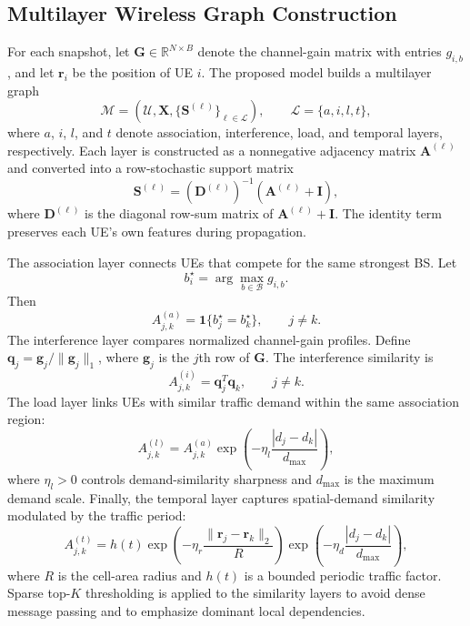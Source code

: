 \documentclass[journal]{IEEEtran}
\begin{document}
\subsection{Multilayer Wireless Graph Construction}
For each snapshot, let $\mathbf{G}\in\mathbb{R}^{N\times B}$ denote the
channel-gain matrix with entries $g_{i,b}$, and let $\mathbf{r}_i$ be the
position of UE $i$. The proposed model builds a multilayer graph
\begin{equation}
    \mathcal{M} = \left(\mathcal{U},\mathbf{X},
    \{\mathbf{S}^{(\ell)}\}_{\ell\in\mathcal{L}}\right),
    \qquad
    \mathcal{L}=\{a,i,l,t\},
\end{equation}
where $a$, $i$, $l$, and $t$ denote association, interference, load, and
temporal layers, respectively. Each layer is constructed as a nonnegative
adjacency matrix $\mathbf{A}^{(\ell)}$ and converted into a row-stochastic
support matrix
\begin{equation}
    \mathbf{S}^{(\ell)}
    =\left(\mathbf{D}^{(\ell)}\right)^{-1}
    \left(\mathbf{A}^{(\ell)}+\mathbf{I}\right),
    \label{eq:support}
\end{equation}
where $\mathbf{D}^{(\ell)}$ is the diagonal row-sum matrix of
$\mathbf{A}^{(\ell)}+\mathbf{I}$. The identity term preserves each UE's own
features during propagation.

The association layer connects UEs that compete for the same strongest BS. Let
\begin{equation}
    b_i^{\star}=\arg\max_{b\in\mathcal{B}} g_{i,b}.
\end{equation}
Then
\begin{equation}
    A_{j,k}^{(a)} =
    \mathbf{1}\{b_j^{\star}=b_k^{\star}\},
    \qquad j\neq k.
\end{equation}
The interference layer compares normalized channel-gain profiles. Define
$\mathbf{q}_j=\mathbf{g}_j/\|\mathbf{g}_j\|_1$, where $\mathbf{g}_j$ is the
$j$th row of $\mathbf{G}$. The interference similarity is
\begin{equation}
    A_{j,k}^{(i)} = \mathbf{q}_j^T\mathbf{q}_k,\qquad j\neq k.
\end{equation}
The load layer links UEs with similar traffic demand within the same
association region:
\begin{equation}
    A_{j,k}^{(l)} =
    A_{j,k}^{(a)}
    \exp\left(-\eta_l\frac{|d_j-d_k|}{d_{\max}}\right),
\end{equation}
where $\eta_l>0$ controls demand-similarity sharpness and $d_{\max}$ is the
maximum demand scale. Finally, the temporal layer captures spatial-demand
similarity modulated by the traffic period:
\begin{equation}
    A_{j,k}^{(t)} =
    h(t)\exp\left(-\eta_r\frac{\|\mathbf{r}_j-\mathbf{r}_k\|_2}{R}\right)
    \exp\left(-\eta_d\frac{|d_j-d_k|}{d_{\max}}\right),
\end{equation}
where $R$ is the cell-area radius and $h(t)$ is a bounded periodic traffic
factor. Sparse top-$K$ thresholding is applied to the similarity layers to
avoid dense message passing and to emphasize dominant local dependencies.
\end{document}
